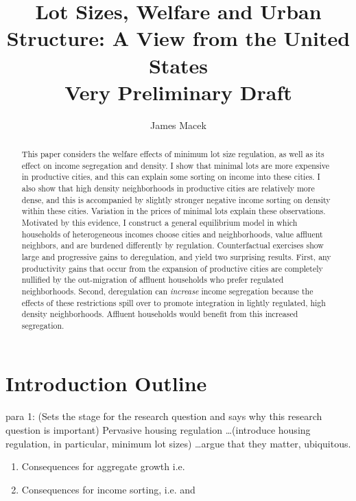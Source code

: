 \documentclass[]{article}
\title{Lot Sizes, Welfare and Urban Structure: A View from the United States \\
	Very Preliminary Draft}
\author{James Macek}
\begin{document}
\maketitle	
		
\begin{abstract}
	\scriptsize
This paper considers the welfare effects of minimum lot size regulation, as well as its effect on income segregation and density. I show that minimal lots are more expensive in productive cities, and this can explain some sorting on income into these cities. I also show that high density neighborhoods in productive cities are relatively more dense, and this is accompanied by slightly stronger negative income sorting on density within these cities. Variation in the prices of minimal lots explain these observations. Motivated by this evidence, I construct a general equilibrium model in which households of heterogeneous incomes choose cities and neighborhoods, value affluent neighbors, and are burdened differently by regulation. Counterfactual exercises show large and progressive gains to deregulation, and yield two surprising results. First, any productivity gains that occur from the expansion of productive cities are completely nullified by the out-migration of affluent households who prefer regulated neighborhoods. Second, deregulation can \textit{increase} income segregation because the effects of these restrictions spill over to promote integration in lightly regulated, high density neighborhoods. Affluent households would benefit from this increased segregation. 
\end{abstract}	


\newpage
	\section*{Introduction Outline}
	\paragraph*{}
	para 1: (Sets the stage for the research question and says why this research question is important) Pervasive housing regulation \dots (introduce housing regulation, in particular, minimum lot sizes) \dots argue that they matter, ubiquitous.
	\begin{enumerate}
		\item Consequences for aggregate growth i.e. \cite{hseihmoretti}
		\item Consequences for income sorting, i.e. \cite{Song} and \cite{kulka}
	\end{enumerate}
	
\end{document}
